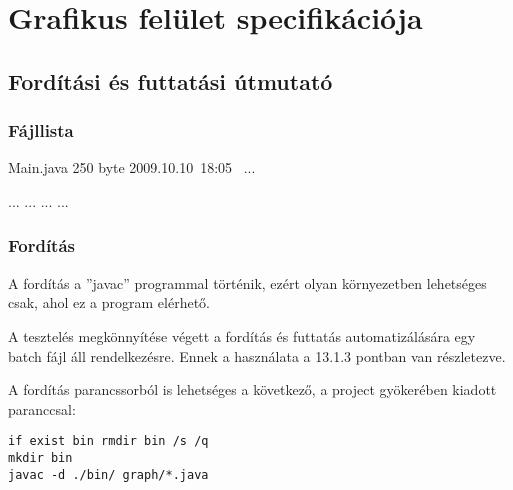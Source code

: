 %
\chapter{Grafikus felület specifikációja}

\thispagestyle{fancy}

\section{Fordítási és futtatási útmutató}

\subsection{Fájllista}

\begin{fajllista}

\fajl
{Main.java} %
{250 byte} %
{2009.10.10~18:05~} %
{...} %

\fajl
{...}
{...}
{...}
{...}

\end{fajllista}

\lstset{escapeinside=`', xleftmargin=10pt, frame=single, basicstyle=\ttfamily\footnotesize, language=sh}

\subsection{Fordítás}


A fordítás a ''javac'' programmal történik, ezért olyan környezetben lehetséges csak, ahol ez a program elérhető. 

A tesztelés megkönnyítése végett a fordítás és futtatás automatizálására egy batch fájl áll rendelkezésre. Ennek a használata a 13.1.3 pontban van részletezve. 

A fordítás parancssorból is lehetséges a következő, a project gyökerében kiadott paranccsal:

\begin{lstlisting}
if exist bin rmdir bin /s /q
mkdir bin
javac -d ./bin/ graph/*.java
\end{lstlisting}

